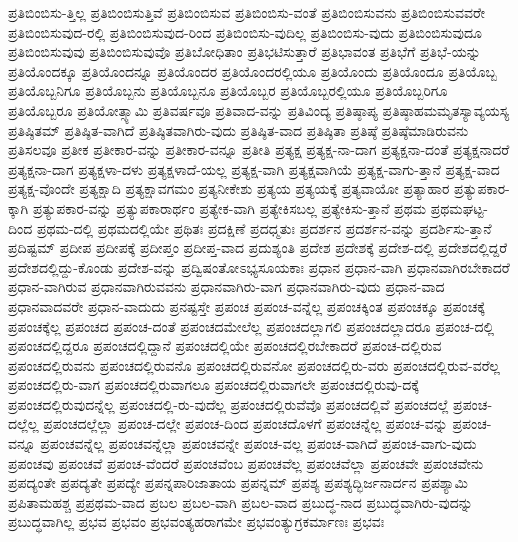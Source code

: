 {ಪ್ರತಿಬಿಂಬಿಸು-ತ್ತಿಲ್ಲ
ಪ್ರತಿಬಿಂಬಿಸುತ್ತಿವೆ
ಪ್ರತಿಬಿಂಬಿಸುವ
ಪ್ರತಿಬಿಂಬಿಸು-ವಂತೆ
ಪ್ರತಿಬಿಂಬಿಸುವನು
ಪ್ರತಿಬಿಂಬಿಸುವವರೇ
ಪ್ರತಿಬಿಂಬಿಸುವುದ-ರಲ್ಲಿ
ಪ್ರತಿಬಿಂಬಿಸುವುದ-ರಿಂದ
ಪ್ರತಿಬಿಂಬಿಸು-ವುದಿಲ್ಲ
ಪ್ರತಿಬಿಂಬಿಸು-ವುದು
ಪ್ರತಿಬಿಂಬಿಸುವುದೂ
ಪ್ರತಿಬಿಂಬಿಸುವುವು
ಪ್ರತಿಬಿಂಬಿಸುವುವೊ
ಪ್ರತಿಬೋಧಿತಾಂ
ಪ್ರತಿಭಟಿಸುತ್ತಾರೆ
ಪ್ರತಿಭಾವಂತ
ಪ್ರತಿಭೆಗೆ
ಪ್ರತಿಭೆ-ಯನ್ನು
ಪ್ರತಿಯೊಂದಕ್ಕೂ
ಪ್ರತಿಯೊಂದನ್ನೂ
ಪ್ರತಿಯೊಂದರ
ಪ್ರತಿಯೊಂದರಲ್ಲಿಯೂ
ಪ್ರತಿಯೊಂದು
ಪ್ರತಿಯೊಂದೂ
ಪ್ರತಿಯೊಬ್ಬ
ಪ್ರತಿಯೊಬ್ಬನಿಗೂ
ಪ್ರತಿಯೊಬ್ಬನು
ಪ್ರತಿಯೊಬ್ಬನೂ
ಪ್ರತಿಯೊಬ್ಬರ
ಪ್ರತಿಯೊಬ್ಬರಲ್ಲಿಯೂ
ಪ್ರತಿಯೊಬ್ಬರಿಗೂ
ಪ್ರತಿಯೊಬ್ಬರೂ
ಪ್ರತಿಯೋತ್ಸ್ಯಾಮಿ
ಪ್ರತಿವರ್ಷವೂ
ಪ್ರತಿವಾದ-ವನ್ನು
ಪ್ರತಿವಿಂದ್ಯ
ಪ್ರತಿಷ್ಠಾಪ್ಯ
ಪ್ರತಿಷ್ಠಾಹಮಮೃತಸ್ಯಾವ್ಯಯಸ್ಯ
ಪ್ರತಿಷ್ಠಿತಮ್
ಪ್ರತಿಷ್ಠಿತ-ವಾಗಿದೆ
ಪ್ರತಿಷ್ಠಿತವಾಗಿರು-ವುದು
ಪ್ರತಿಷ್ಠಿತ-ವಾದ
ಪ್ರತಿಷ್ಠಿತಾ
ಪ್ರತಿಷ್ಠೆ
ಪ್ರತಿಷ್ಠೆಮಾಡಿರುವನು
ಪ್ರತಿಸಲವೂ
ಪ್ರತೀಕ
ಪ್ರತೀಕಾರ-ವನ್ನು
ಪ್ರತೀಕಾರ-ವನ್ನೂ
ಪ್ರತೀತಿ
ಪ್ರತ್ಯಕ್ಷ
ಪ್ರತ್ಯಕ್ಷ-ನಾ-ದಾಗ
ಪ್ರತ್ಯಕ್ಷನಾ-ದಂತೆ
ಪ್ರತ್ಯಕ್ಷನಾದರೆ
ಪ್ರತ್ಯಕ್ಷನಾ-ದಾಗ
ಪ್ರತ್ಯಕ್ಷಳಾ-ದಳು
ಪ್ರತ್ಯಕ್ಷಳಾದೆ-ಯಲ್ಲ
ಪ್ರತ್ಯಕ್ಷ-ವಾಗಿ
ಪ್ರತ್ಯಕ್ಷವಾಗಿಯೆ
ಪ್ರತ್ಯಕ್ಷ-ವಾಗು-ತ್ತಾನೆ
ಪ್ರತ್ಯಕ್ಷ-ವಾದ
ಪ್ರತ್ಯಕ್ಷ-ವೊಂದೇ
ಪ್ರತ್ಯಕ್ಷಾದಿ
ಪ್ರತ್ಯಕ್ಷಾವಗಮಂ
ಪ್ರತ್ಯನೀಕೇಶು
ಪ್ರತ್ಯಯ
ಪ್ರತ್ಯಯಕ್ಕೆ
ಪ್ರತ್ಯವಾಯೋ
ಪ್ರತ್ಯಾಹಾರ
ಪ್ರತ್ಯುಪಕಾರ-ಕ್ಕಾಗಿ
ಪ್ರತ್ಯುಪಕಾರ-ವನ್ನು
ಪ್ರತ್ಯುಪಕಾರಾರ್ಥಂ
ಪ್ರತ್ಯೇಕ-ವಾಗಿ
ಪ್ರತ್ಯೇಕಿಸಬಲ್ಲ
ಪ್ರತ್ಯೇಕಿಸು-ತ್ತಾನೆ
ಪ್ರಥಮ
ಪ್ರಥಮಘಟ್ಟ-ದಿಂದ
ಪ್ರಥಮ-ದಲ್ಲಿ
ಪ್ರಥಮದಲ್ಲಿಯೇ
ಪ್ರಥಿತಃ
ಪ್ರದಕ್ಷಿಣೆ
ಪ್ರದಧ್ಮತುಃ
ಪ್ರದರ್ಶನ
ಪ್ರದರ್ಶನ-ವನ್ನು
ಪ್ರದರ್ಶಿಸು-ತ್ತಾನೆ
ಪ್ರದಿಷ್ಟಮ್
ಪ್ರದೀಪ
ಪ್ರದೀಪಕ್ಕೆ
ಪ್ರದೀಪ್ತಂ
ಪ್ರದೀಪ್ತ-ವಾದ
ಪ್ರದುಶ್ಯಂತಿ
ಪ್ರದೇಶ
ಪ್ರದೇಶಕ್ಕೆ
ಪ್ರದೇಶ-ದಲ್ಲಿ
ಪ್ರದೇಶದಲ್ಲಿದ್ದರೆ
ಪ್ರದೇಶದಲ್ಲಿದ್ದು-ಕೊಂಡು
ಪ್ರದೇಶ-ವನ್ನು
ಪ್ರದ್ವಿಷಂತೋಽಭ್ಯಸೂಯಕಾಃ
ಪ್ರಧಾನ
ಪ್ರಧಾನ-ವಾಗಿ
ಪ್ರಧಾನವಾಗಿರಬೇಕಾದರೆ
ಪ್ರಧಾನ-ವಾಗಿರುವ
ಪ್ರಧಾನವಾಗಿರುವವನು
ಪ್ರಧಾನವಾಗಿರು-ವಾಗ
ಪ್ರಧಾನವಾಗಿರು-ವುದು
ಪ್ರಧಾನ-ವಾದ
ಪ್ರಧಾನವಾದವರೇ
ಪ್ರಧಾನ-ವಾದುದು
ಪ್ರನಷ್ಟಸ್ತೇ
ಪ್ರಪಂಚ
ಪ್ರಪಂಚ-ವನ್ನೆಲ್ಲ
ಪ್ರಪಂಚಕ್ಕಿಂತ
ಪ್ರಪಂಚಕ್ಕೂ
ಪ್ರಪಂಚಕ್ಕೆ
ಪ್ರಪಂಚಕ್ಕೆಲ್ಲ
ಪ್ರಪಂಚದ
ಪ್ರಪಂಚ-ದಂತೆ
ಪ್ರಪಂಚದಮೇಲೆಲ್ಲ
ಪ್ರಪಂಚದಲ್ಲಾಗಲಿ
ಪ್ರಪಂಚದಲ್ಲಾದರೂ
ಪ್ರಪಂಚ-ದಲ್ಲಿ
ಪ್ರಪಂಚದಲ್ಲಿದ್ದರೂ
ಪ್ರಪಂಚದಲ್ಲಿದ್ದಾನೆ
ಪ್ರಪಂಚದಲ್ಲಿಯೇ
ಪ್ರಪಂಚದಲ್ಲಿರಬೇಕಾದರೆ
ಪ್ರಪಂಚ-ದಲ್ಲಿರುವ
ಪ್ರಪಂಚದಲ್ಲಿರುವನು
ಪ್ರಪಂಚದಲ್ಲಿರುವನೊ
ಪ್ರಪಂಚದಲ್ಲಿರುವನೋ
ಪ್ರಪಂಚದಲ್ಲಿರು-ವರು
ಪ್ರಪಂಚದಲ್ಲಿರುವ-ವರೆಲ್ಲ
ಪ್ರಪಂಚದಲ್ಲಿರು-ವಾಗ
ಪ್ರಪಂಚದಲ್ಲಿರುವಾಗಲೂ
ಪ್ರಪಂಚದಲ್ಲಿರುವಾಗಲೇ
ಪ್ರಪಂಚದಲ್ಲಿರುವು-ದಕ್ಕೆ
ಪ್ರಪಂಚದಲ್ಲಿರುವುದನ್ನೆಲ್ಲ
ಪ್ರಪಂಚದಲ್ಲಿ-ರು-ವುದೆಲ್ಲ
ಪ್ರಪಂಚದಲ್ಲಿರುವೆವೊ
ಪ್ರಪಂಚದಲ್ಲಿವೆ
ಪ್ರಪಂಚದಲ್ಲೆ
ಪ್ರಪಂಚ-ದಲ್ಲೆಲ್ಲ
ಪ್ರಪಂಚದಲ್ಲೆಲ್ಲಾ
ಪ್ರಪಂಚ-ದಲ್ಲೇ
ಪ್ರಪಂಚ-ದಿಂದ
ಪ್ರಪಂಚದೊಳಗೆ
ಪ್ರಪಂಚನ್ನೆಲ್ಲ
ಪ್ರಪಂಚ-ವನ್ನು
ಪ್ರಪಂಚ-ವನ್ನೂ
ಪ್ರಪಂಚವನ್ನೆಲ್ಲ
ಪ್ರಪಂಚವನ್ನೆಲ್ಲಾ
ಪ್ರಪಂಚವನ್ನೇ
ಪ್ರಪಂಚ-ವಲ್ಲ
ಪ್ರಪಂಚ-ವಾಗಿದೆ
ಪ್ರಪಂಚ-ವಾಗು-ವುದು
ಪ್ರಪಂಚವು
ಪ್ರಪಂಚವೆ
ಪ್ರಪಂಚ-ವೆಂದರೆ
ಪ್ರಪಂಚವೆಂಬ
ಪ್ರಪಂಚವೆಲ್ಲ
ಪ್ರಪಂಚವೆಲ್ಲಾ
ಪ್ರಪಂಚವೇ
ಪ್ರಪಂಚವೇನು
ಪ್ರಪದ್ಯಂತೇ
ಪ್ರಪದ್ಯತೇ
ಪ್ರಪದ್ಯೇ
ಪ್ರಪನ್ನಪಾರಿಜಾತಾಯ
ಪ್ರಪನ್ನಮ್
ಪ್ರಪಶ್ಯ
ಪ್ರಪಶ್ಯದ್ಭಿರ್ಜನಾರ್ದನ
ಪ್ರಪಶ್ಯಾಮಿ
ಪ್ರಪಿತಾಮಹಶ್ಚ
ಪ್ರಪ್ರಥಮ-ವಾದ
ಪ್ರಬಲ
ಪ್ರಬಲ-ವಾಗಿ
ಪ್ರಬಲ-ವಾದ
ಪ್ರಬುದ್ಧ-ನಾದ
ಪ್ರಬುದ್ಧವಾಗಿರು-ವುದನ್ನು
ಪ್ರಬುದ್ಧವಾಗಿಲ್ಲ
ಪ್ರಭವ
ಪ್ರಭವಂ
ಪ್ರಭವಂತ್ಯಹರಾಗಮೇ
ಪ್ರಭವಂತ್ಯುಗ್ರಕರ್ಮಾಣಃ
ಪ್ರಭವಃ
}
